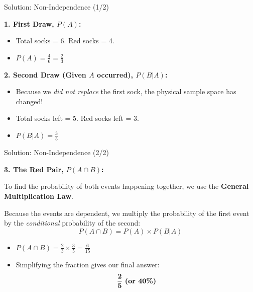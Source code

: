 \begin{frame}{Solution: Non-Independence (1/2)}
    \begin{solution}
        \textbf{1. First Draw, $P(A)$:}
        \begin{itemize}
            \item Total socks = 6. Red socks = 4.
            \item $P(A) = \frac{4}{6} = \frac{2}{3}$
        \end{itemize}

        \pause \vspace{0.5cm}

        \textbf{2. Second Draw (Given $A$ occurred), $P(B|A)$:}
        \begin{itemize}
            \item Because we \textit{did not replace} the first sock, the physical sample space has changed!
            \item Total socks left = 5. Red socks left = 3.
            \item $P(B|A) = \frac{3}{5}$
        \end{itemize}
    \end{solution}
\end{frame}

\begin{frame}{Solution: Non-Independence (2/2)}
    \begin{solutioncont}
        \textbf{3. The Red Pair, $P(A \cap B)$:}
        
        \vspace{0.2cm}
        To find the probability of both events happening together, we use the \textbf{General Multiplication Law}. 
        
        \vspace{0.2cm}
        Because the events are dependent, we multiply the probability of the first event by the \textit{conditional} probability of the second:
        \[ P(A \cap B) = P(A) \times P(B|A) \]
        
        \pause \vspace{0.3cm}
        
        \begin{itemize}
            \item $P(A \cap B) = \frac{2}{3} \times \frac{3}{5} = \frac{6}{15}$
            
            \vspace{0.2cm}
            \item Simplifying the fraction gives our final answer:
            \[ \mathbf{\frac{2}{5}} \text{ \textbf{(or 40\%)}} \]
        \end{itemize}
    \end{solutioncont}
\end{frame}

